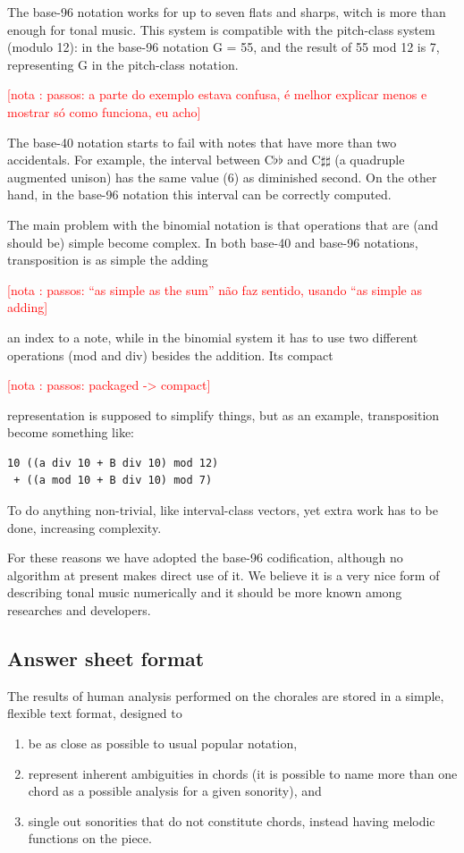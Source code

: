 \documentclass{article}
\newcounter{notacounter}
\newcommand{\nota}[1]{
  \addtocounter{notacounter}{1}
  \textcolor{red}{[nota \arabic{notacounter}: #1]}
}
\begin{document}
The base-96 notation works for up to seven flats and sharps, witch is
more than enough for tonal music. This system is compatible with the
pitch-class system (modulo 12): in the base-96 notation G = 55, and
the result of 55 mod 12 is 7, representing G in the pitch-class
notation. \nota{passos: a parte do exemplo estava confusa, é melhor
  explicar menos e mostrar só como funciona, eu acho}

The base-40 notation starts to fail with notes that have more than two
accidentals. For example, the interval between C$\flat\flat$ and
C$\sharp\sharp$ (a quadruple augmented unison) has the same value (6)
as diminished second. On the other hand, in the base-96 notation this
interval can be correctly computed.

The main problem with the binomial notation is that operations that
are (and should be) simple become complex. In both base-40 and base-96
notations, transposition is as simple the adding \nota{passos: ``as
  simple as the sum'' não faz sentido, usando ``as simple as adding}
an index to a note, while in the binomial system it has to use two
different operations (mod and div) besides the addition. Its compact
\nota{passos: packaged -> compact} 
representation is supposed to simplify things, but as an example,
transposition become something like:

\begin{verbatim}
10 ((a div 10 + B div 10) mod 12)
 + ((a mod 10 + B div 10) mod 7)
\end{verbatim}

To do anything non-trivial, like interval-class vectors, yet extra
work has to be done, increasing complexity.

For these reasons we have adopted the base-96 codification, although
no algorithm at present makes direct use of it. We believe it is a
very nice form of describing tonal music numerically and it should be
more known among researches and developers.

\subsection{Answer sheet format}
\label{sec:formato-dos-acordes}

The results of human analysis performed on the chorales are stored in
a simple, flexible text format, designed to

\begin{enumerate}
\item be as close as possible to usual popular notation,
\item represent inherent ambiguities in chords (it is possible to name
  more than one chord as a possible analysis for a given sonority),
  and
\item single out sonorities that do not constitute chords, instead
  having melodic functions on the piece.
\end{enumerate}
\end{document}
